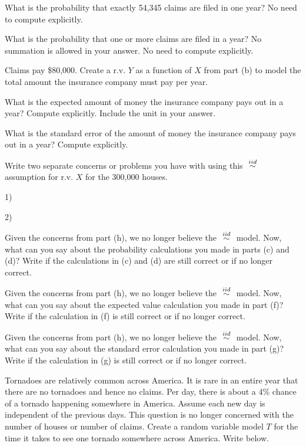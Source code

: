 \documentclass[12pt]{article}
\begin{document}
 What is the probability that exactly 54,345 claims are filed in one year? No need to compute explicitly. 

 What is the probability that one or more claims are filed in a year? No summation is allowed in your answer. No need to compute explicitly. 

 Claims pay \$80,000. Create a r.v. $Y$ as a function of $X$ from part (b) to model the total amount the insurance company must pay per year.  

 What is the expected amount of money the insurance company pays out in a year? Compute explicitly. Include the unit in your answer. 

 What is the standard error of the amount of money the insurance company pays out in a year? Compute explicitly. 

 Write two separate concerns or problems you have with using this $\iid$ assumption for r.v. $X$ for the 300,000 houses. 

1) \vspace{3cm}

2) \vspace{3cm}

 Given the concerns from part (h), we no longer believe the $\iid$ model. Now, what can you say about the probability calculations you made in parts (c) and (d)? Write  if the calculations in (c) and (d) are still correct or  if no longer correct. 


 Given the concerns from part (h), we no longer believe the $\iid$ model. Now, what can you say about the expected value calculation you made in part (f)? Write  if the calculation in (f) is still correct or  if no longer correct. 


 Given the concerns from part (h), we no longer believe the $\iid$ model. Now, what can you say about the standard error calculation you made in part (g)? Write  if the calculation in (g) is still correct or  if no longer correct. 

 Tornadoes are relatively common across America. It is rare in an entire year that there are no tornadoes and hence no claims. Per day, there is about a 4\% chance of a tornado happening somewhere in America. Assume each new day is independent of the previous days. This question is no longer concerned with the number of houses or number of claims. Create a random variable model $T$ for the time it takes to see one tornado somewhere across America. Write  below. 
\end{document}
